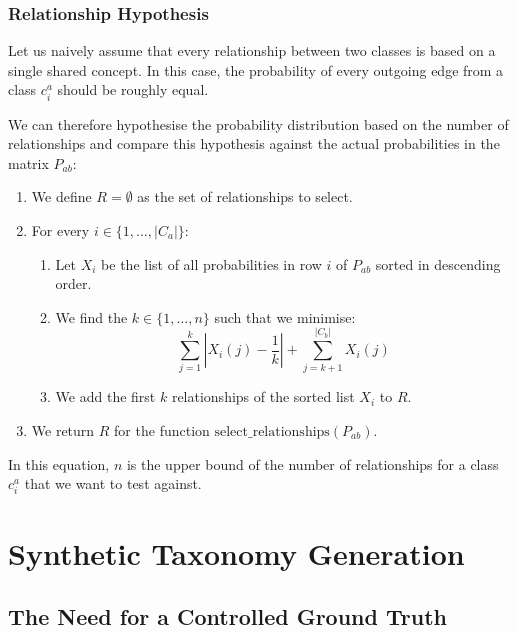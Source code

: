 \subsubsection{Relationship Hypothesis}

Let us naively assume that every relationship between two classes
is based on a single shared concept.
In this case, the probability of every outgoing edge from a class $c_i^a$
should be roughly equal.

We can therefore hypothesise the probability distribution based on the number of relationships
and compare this hypothesis against the actual probabilities in the matrix $P_{ab}$:
\begin{enumerate}
      \item We define $R=\emptyset$ as the set of relationships to select.
      \item For every $i\in \{1, \ldots, |C_a|\}$:
            \begin{enumerate}
                  \item Let $X_i$ be the list of all probabilities in row $i$ of $P_{ab}$ sorted in descending order.
                  \item We find the $k\in\{1, \ldots, n\}$ such that we minimise:
                        \begin{equation*}
                              \sum_{j=1}^k \left| X_i(j) - \frac{1}{k} \right| + \sum_{j=k+1}^{|C_b|} X_i(j)
                        \end{equation*}
                  \item We add the first $k$ relationships of the sorted list $X_i$ to $R$.
            \end{enumerate}
      \item We return $R$ for the function $\text{select\_relationships}(P_{ab})$.
\end{enumerate}

In this equation, $n$ is the upper bound of the number of relationships
for a class $c_i^a$ that we want to test against.

\section{Synthetic Taxonomy Generation}

\subsection{The Need for a Controlled Ground Truth}

